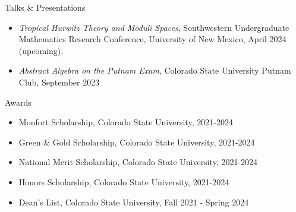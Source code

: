 \documentclass[
	11pt, %
]{resume} %
\begin{document}

\begin{rSection}{Talks \& Presentations}

	\begin{itemize}
		\item{\textit{Tropical Hurwitz Theory and Moduli Spaces}, Southwestern Undergraduate Mathematics Research Conference, University of New Mexico, April 2024 (upcoming).}
		\item{\textit{Abstract Algebra on the Putnam Exam}, Colorado State University Putnam Club, September 2023}
	\end{itemize}
	
\end{rSection}


\begin{rSection}{Awards} %


	\begin{itemize}
		\item{Monfort Scholarship, Colorado State University, 2021-2024}
		\item{Green \& Gold Scholarship, Colorado State University, 2021-2024}
		\item{National Merit Scholarship, Colorado State University, 2021-2024}
		\item{Honors Scholarship, Colorado State University, 2021-2024}
		\item{Dean's List, Colorado State University, Fall 2021 - Spring 2024}
	\end{itemize}
	
\end{rSection}

\end{document}
